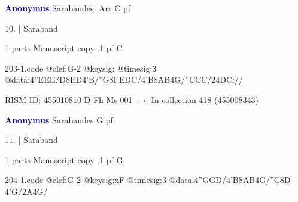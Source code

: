 \documentclass[twocolumn]{book}
\begin{document}
\newline \par \vspace{7pt} \textcolor{darkblue}{\textbf{Anonymus  }}
\newline Sarabandes. Arr  C  
\newline pf
\newline \begin{itshape}[f.7v, at left:] 10. | Saraband\end{itshape} 
\newline \textcolor{darkblue}{}  1 parts  
\newline Manuscript copy
.1  pf  C  
\begin{filecontents*}{203-1.code}
@clef:G-2
@keysig:
@timesig:3
@data:4''EEE/D{8ED}4'B/''G{8FEDC}/4'B{8AB}4G/''CCC/24DC://
\end{filecontents*}
\newline
%

\newline RISM-ID: 455010810
\newline D-Fh  Ms 001
\newline $\rightarrow$ In collection 418 (455008343)

\newline \par \vspace{7pt} \textcolor{darkblue}{\textbf{Anonymus  }}
\newline Sarabandes  G  
\newline pf
\newline \begin{itshape}[f.7v, at left:] 11. | Saraband\end{itshape} 
\newline \textcolor{darkblue}{}  1 parts  
\newline Manuscript copy
.1  pf  G  
\begin{filecontents*}{204-1.code}
@clef:G-2
@keysig:xF
@timesig:3
@data:4''GGD/4'B{8AB}4G/''C8D-4'G/2A4G/
\end{filecontents*}
\newline
%
\end{document}
